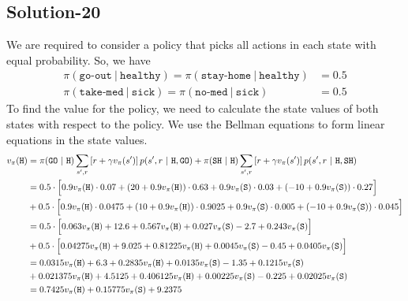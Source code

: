 \documentclass[11pt]{article}
\begin{document}
    \subsection*{Solution-20}
    We are required to consider a policy that picks all actions in each state with equal probability.
    So, we have
    \begin{align*}
        \pi(\texttt{go-out} \ | \ \texttt{healthy}) = \pi(\texttt{stay-home} \ | \ \texttt{healthy}) &= 0.5 \\
        \pi(\texttt{take-med} \ | \ \texttt{sick}) = \pi(\texttt{no-med} \ | \ \texttt{sick}) &= 0.5
    \end{align*}
    To find the value for the policy, we need to calculate the state values of both states with
    respect to the policy. We use the Bellman equations to form linear equations in the state values.
    \begin{align*}
        v_{\pi}(\texttt{H}) &= \pi(\texttt{GO} \ | \ \texttt{H}) \sum_{s', r} \left[ r + \gamma v_{\pi}(s') \right] p(s', r \ | \ \texttt{H}, \texttt{GO})
        + \pi(\texttt{SH} \ | \ \texttt{H}) \sum_{s', r} \left[ r + \gamma v_{\pi}(s') \right] p(s', r \ | \ \texttt{H}, \texttt{SH}) \\
        &= 0.5 \cdot \Big{[} 0.9 v_{\pi}(\texttt{H}) \cdot 0.07 + (20 + 0.9 v_{\pi}(\texttt{H})) \cdot 0.63 + 0.9 v_{\pi}(\texttt{S}) \cdot 0.03 + (-10 + 0.9 v_{\pi}(\texttt{S})) \cdot 0.27 \Big{]} \\
        &+ 0.5 \cdot \Big{[} 0.9 v_{\pi}(\texttt{H}) \cdot 0.0475 + (10 + 0.9 v_{\pi}(\texttt{H})) \cdot 0.9025 + 0.9 v_{\pi}(\texttt{S}) \cdot 0.005 + (-10 + 0.9 v_{\pi}(\texttt{S})) \cdot 0.045 \Big{]} \\
        &= 0.5 \cdot \Big{[}0.063 v_{\pi}(\texttt{H}) + 12.6 + 0.567 v_{\pi}(\texttt{H}) + 0.027 v_{\pi}(\texttt{S}) - 2.7 + 0.243 v_{\pi}(\texttt{S}) \Big{]} \\
        &+ 0.5 \cdot \Big{[}0.04275 v_{\pi}(\texttt{H}) + 9.025 + 0.81225 v_{\pi}(\texttt{H}) + 0.0045 v_{\pi}(\texttt{S}) - 0.45 + 0.0405 v_{\pi}(\texttt{S}) \Big{]} \\
        &= 0.0315 v_{\pi}(\texttt{H}) + 6.3 + 0.2835 v_{\pi}(\texttt{H}) + 0.0135 v_{\pi}(\texttt{S}) - 1.35 + 0.1215 v_{\pi}(\texttt{S}) \\
        &+ 0.021375 v_{\pi}(\texttt{H}) + 4.5125 + 0.406125 v_{\pi}(\texttt{H}) + 0.00225 v_{\pi}(\texttt{S}) - 0.225 + 0.02025 v_{\pi}(\texttt{S}) \\
        &= 0.7425 v_{\pi}(\texttt{H}) + 0.15775 v_{\pi}(\texttt{S}) + 9.2375
    \end{align*}
\end{document}
